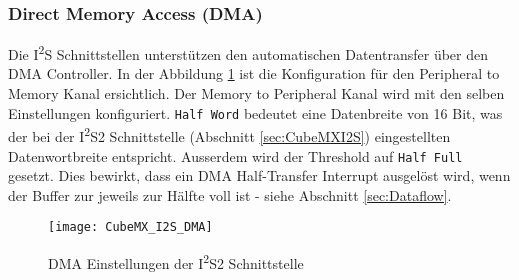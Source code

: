 \subsubsection{Direct Memory Access (DMA)}
\label{sec:CubeMXDMA}

Die I\textsuperscript{2}S Schnittstellen unterstützen den automatischen Datentransfer über den DMA Controller. In der Abbildung \ref{pic:CubeMX_I2S_DMA} ist die Konfiguration für den Peripheral to Memory Kanal ersichtlich. Der Memory to Peripheral Kanal wird mit den selben Einstellungen konfiguriert. \texttt{Half Word} bedeutet eine Datenbreite von 16 Bit, was der bei der I\textsuperscript{2}S2 Schnittstelle (Abschnitt \ref{sec:CubeMXI2S}) eingestellten Datenwortbreite entspricht.
Ausserdem wird der Threshold auf \texttt{Half Full} gesetzt. Dies bewirkt, dass ein DMA Half-Transfer Interrupt ausgelöst wird, wenn der Buffer zur jeweils zur Hälfte voll ist - siehe Abschnitt \ref{sec:Dataflow}.

\begin{figure}[H]
	\centering
	\texttt{[image: CubeMX\_I2S\_DMA]}
	\caption{DMA Einstellungen der I\textsuperscript{2}S2 Schnittstelle}
	\label{pic:CubeMX_I2S_DMA}
\end{figure}

\newpage